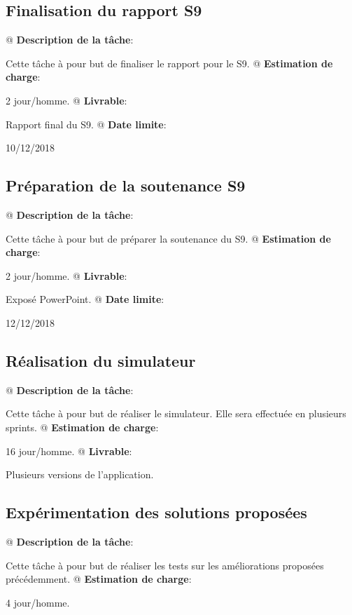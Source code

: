 \documentclass[noposter,final]{polytech/polytech}
\begin{document}
		\subsection{Finalisation du rapport S9}
			\begin{easylist}
				@ \textbf{Description de la tâche}:
				
				Cette tâche à pour but de finaliser le rapport pour le S9.
				@ \textbf{Estimation de charge}:
				
				2 jour/homme.
				@ \textbf{Livrable}:
				
				Rapport final du S9.
				@ \textbf{Date limite}:
				
				10/12/2018
			\end{easylist}
			
		\subsection{Préparation de la soutenance S9}
			\begin{easylist}
				@ \textbf{Description de la tâche}:
				
				Cette tâche à pour but de préparer la soutenance du S9.
				@ \textbf{Estimation de charge}:
				
				2 jour/homme.
				@ \textbf{Livrable}:
				
				Exposé PowerPoint.
				@ \textbf{Date limite}:
				
				12/12/2018
			\end{easylist}
			
		\subsection{Réalisation du simulateur}
			\begin{easylist}
				@ \textbf{Description de la tâche}:
				
				Cette tâche à pour but de réaliser le simulateur.
				Elle sera effectuée en plusieurs sprints.
				@ \textbf{Estimation de charge}:
				
				16 jour/homme.
				@ \textbf{Livrable}:
				
				Plusieurs versions de l'application.
			\end{easylist}
			
		\subsection{Expérimentation des solutions proposées}
			\begin{easylist}
				@ \textbf{Description de la tâche}:
				
				Cette tâche à pour but de réaliser les tests sur les améliorations proposées précédemment.			
				@ \textbf{Estimation de charge}:
				
				4 jour/homme.
			\end{easylist}
			
\end{document}
